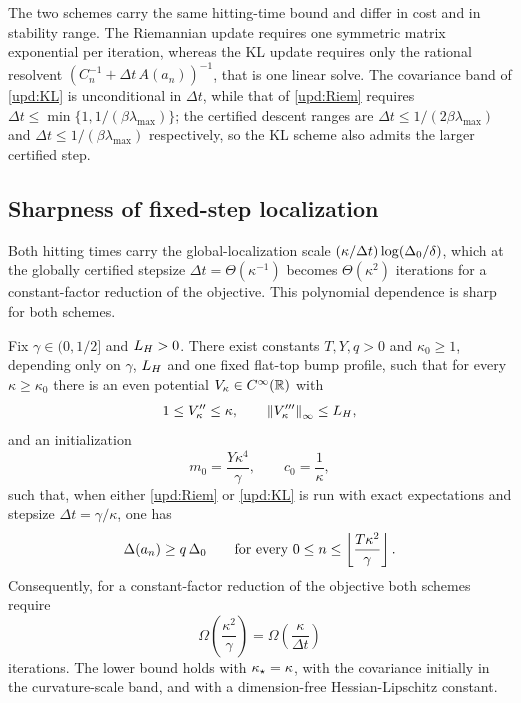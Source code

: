 The two schemes carry the same hitting-time bound and differ in cost and in stability
range. The Riemannian update requires one symmetric matrix exponential per iteration,
whereas the KL update requires only the rational resolvent
$(C_n^{-1}+\Delta t\,A(a_n))^{-1}$, that is one linear solve. The covariance band of
\eqref{upd:KL} is unconditional in $\Delta t$, while that of \eqref{upd:Riem} requires
$\Delta t\leq\min\{1,1/(\beta\lambda_{\max})\}$; the certified descent ranges are
$\Delta t\leq1/(2\beta\lambda_{\max})$ and $\Delta t\leq1/(\beta\lambda_{\max})$
respectively, so the KL scheme also admits the larger certified step.

\subsection{Sharpness of fixed-step localization}

Both hitting times carry the global-localization scale
$(\kappa/\Delta t)\log(\Delta_0/\delta)$, which at the globally certified stepsize
$\Delta t=\Theta(\kappa^{-1})$ becomes $\Theta(\kappa^2)$ iterations for a constant-factor
reduction of the objective. This polynomial dependence is sharp for both schemes.

\begin{theorem}\label{thm:sharp-disc}
    Fix $\gamma\in(0,1/2]$ and $L_H>0$. There exist constants $T,Y,q>0$ and $\kappa_0\geq1$,
    depending only on $\gamma$, $L_H$ and one fixed flat-top bump profile, such that for every
    $\kappa\geq\kappa_0$ there is an even potential $V_\kappa\in C^\infty(\mathbb{R})$ with
    \begin{equation*}
        1\leq V_\kappa''\leq\kappa,
        \qquad
        \left\lVert V_\kappa'''\right\rVert_\infty\leq L_H,
    \end{equation*}
    and an initialization
    \begin{equation*}
        m_0=\frac{Y\kappa^4}\gamma,
        \qquad
        c_0=\frac1\kappa,
    \end{equation*}
    such that, when either \eqref{upd:Riem} or \eqref{upd:KL} is run with exact expectations
    and stepsize $\Delta t=\gamma/\kappa$, one has
    \begin{equation*}
        \Delta(a_n)\geq q\,\Delta_0
        \qquad\text{for every }
        0\leq n\leq\left\lfloor\frac{T\kappa^2}\gamma\right\rfloor.
    \end{equation*}
    Consequently, for a constant-factor reduction of the objective both schemes require
    \begin{equation*}
        \Omega\!\left(\frac{\kappa^2}\gamma\right)=\Omega\!\left(\frac\kappa{\Delta t}\right)
    \end{equation*}
    iterations. The lower bound holds with $\kappa_\star=\kappa$, with the covariance initially
    in the curvature-scale band, and with a dimension-free Hessian-Lipschitz constant.
\end{theorem}

